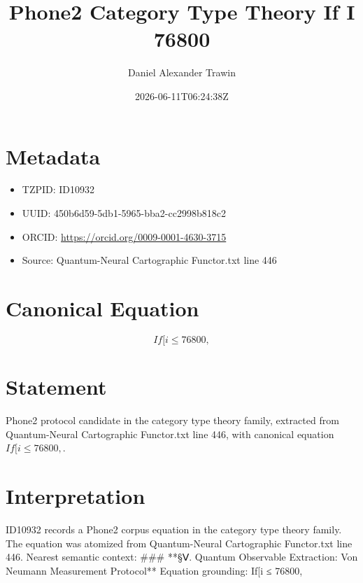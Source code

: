 \documentclass[11pt]{article}
\title{Phone2 Category Type Theory If I 76800}
\author{Daniel Alexander Trawin}
\date{2026-06-11T06:24:38Z}
\begin{document}
\maketitle
\section*{Metadata}
\begin{itemize}
\item TZPID: ID10932
\item UUID: 450b6d59-5db1-5965-bba2-cc2998b818c2
\item ORCID: \url{https://orcid.org/0009-0001-4630-3715}
\item Source: Quantum-Neural Cartographic Functor.txt line 446
\end{itemize}
\section*{Canonical Equation}
\[
If[i ≤ 76800,
\]
\section*{Statement}
Phone2 protocol candidate in the category type theory family, extracted from Quantum-Neural Cartographic Functor.txt line 446, with canonical equation $If[i ≤ 76800,$.
\section*{Interpretation}
ID10932 records a Phone2 corpus equation in the category type theory family. The equation was atomized from Quantum-Neural Cartographic Functor.txt line 446. Nearest semantic context: ### **§Ⅴ. Quantum Observable Extraction: Von Neumann Measurement Protocol** Equation grounding: If[i ≤ 76800,
\end{document}
